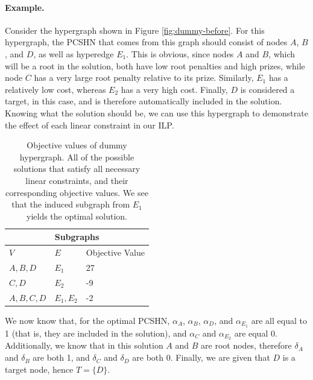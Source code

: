 \documentclass[12pt,twoside]{reedthesis}
\theoremstyle{definition}
\begin{document}
\paragraph{Example.}Consider the hypergraph shown in Figure \ref{fig:dummy-before}. For this hypergraph, the PCSHN that comes from this graph should consist of nodes $A$, $B$, and $D$, as well as hyperedge $E_1$. This is obvious, since nodes $A$ and $B$, which will be a root in the solution, both have low root penalties and high prizes, while node $C$ has a very large root penalty relative to its prize. Similarly, $E_1$ has a relatively low cost, whereas $E_2$ has a very high cost. Finally, $D$ is considered a target, in this case, and is therefore automatically included in the solution. Knowing what the solution should be, we can use this hypergraph to demonstrate the effect of each linear constraint in our ILP.\par

\begin{table}[!h]
\begin{center}
  \label{tab:obj_values_dummy}
  \caption[Objective values of dummy hypergraph.]{Objective values of dummy hypergraph. All of the possible solutions that satisfy all necessary linear constraints, and their corresponding objective values. We see that the induced subgraph from $E_1$ yields the optimal solution.}
\begin{tabular}{ |l|l|l| }%
  \hline%
  \multicolumn{3}{|c|}{Subgraphs} \\%
  \hline \hline
  $V$ & $E$ & Objective Value \\ \hline%
  $A,B,D$ & $E_1$ & 27 \\ \hline%
  $C,D$ & $E_2$ & -9 \\ \hline%
  $A,B,C,D$ & $E_1,E_2$ & -2 \\ \hline%
\end{tabular}%
\end{center}
\end{table}

We now know that, for the optimal PCSHN, $\alpha_A$, $\alpha_B$, $\alpha_D$, and $\alpha_{E_1}$ are all equal to 1 (that is, they are included in the solution), and $\alpha_C$ and $\alpha_{E_2}$ are equal 0. Additionally, we know that in this solution $A$ and $B$ are root nodes, therefore $\delta_A$ and $\delta_B$ are both 1, and $\delta_C$ and $\delta_D$ are both 0. Finally, we are given that $D$ is a target node, hence $T=\{D\}$.\par
\end{document}
